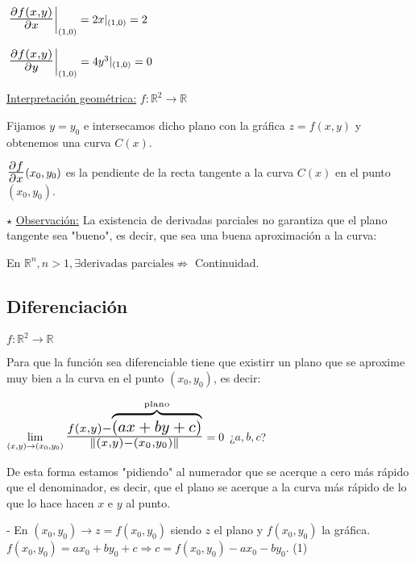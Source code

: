 \documentclass[12pt, titlepage]{article}
\newcommand{\R}{\mathbb{R}}
\newcommand{\bfrac}[2]{\scalebox{1.4}{$\frac{#1}{#2}$}}
\newcommand{\observacion}{\noindent$\star$ \underline{Observación:} }
\begin{document}
$\left.\bfrac{\partial f(x, y)}{\partial x}\right |_{(1, 0)} = 2x |_{(1, 0)} = 2$

$\left.\bfrac{\partial f(x, y)}{\partial y}\right |_{(1, 0)} = 4y^3 |_{(1, 0)} = 0$
\vspace{5mm}

\noindent\underline{Interpretación geométrica:} $f : \R^2 \to \R$
\vspace{3mm}

Fijamos $y = y_0$ e intersecamos dicho plano con la gráfica $z = f (x, y)$ y obtenemos una curva $C (x)$.

$\bfrac{\partial f}{\partial x} (x_0, y_0)$ es la pendiente de la recta tangente a la curva $C (x)$ en el punto 
$(x_0, y_0)$.
\vspace{3mm}

\observacion La existencia de derivadas parciales no garantiza que el plano tangente sea "bueno", es decir, 
que sea una buena aproximación a la curva:
\vspace{3mm}

En $\R^n, n >1, \exists \text{derivadas parciales} \not\Rightarrow$ Continuidad.
\vspace{5mm}

\subsection{Diferenciación}
\vspace{3mm}

$f : \R^2 \to \R$

Para que la función sea diferenciable tiene que existirr un plano que se aproxime muy bien a la curva en el 
punto $(x_0, y_0)$, es decir:
\vspace{3mm}

$\displaystyle \lim_{(x, y) \to (x_0, y_0)} \bfrac{f (x, y) - \overbrace{(ax +by + c)}^{\text{plano}}}{\| (x, y) 
- (x_0, y_0)\|} = 0$ ¿$a, b, c$?
\vspace{3mm}

De esta forma estamos "pidiendo" al numerador que se acerque a cero más rápido que el denominador, es decir, que el plano se acerque a la curva más rápido de lo que lo hace hacen $x$ e $y$ al punto.
\vspace{3mm}

- En $(x_0, y_0) \rightarrow  z = f (x_0, y_0)$ siendo $z$ el plano y $f (x_0, y_0)$ la gráfica. $f (x_0, y_0) = 
a x_0 + b y_0 + c \Rightarrow c = f (x_0, y_0) - a x_0 - b y_0$. (1)
\vspace{3mm}
\end{document}

